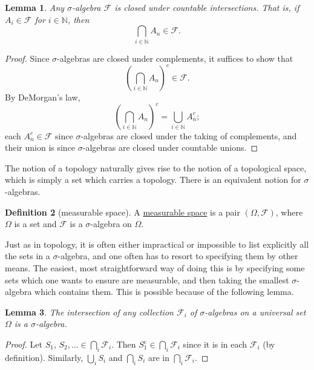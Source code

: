 \documentclass[a4paper,12pt]{scrreprt}
\newcommand{\N}{\mathbb{N}}
\newcommand{\defn}[1]{\ul{#1}}
\theoremstyle{definition}
\newtheorem{definition}{Definition}
\theoremstyle{plain}
\newtheorem{lemma}[definition]{Lemma}
\theoremstyle{remark}
\begin{document}
\begin{lemma}
  \label{lemma:sigmaalgebrasclosedundercountableintersections}
  Any $\sigma$-algebra $\mathcal{F}$ is closed under countable intersections. That is, if $A_{i} \in \mathcal{F}$ for $i \in \N$, then
  \begin{equation*}
    \bigcap_{i \in \N} A_{n} \in \mathcal{F}.
  \end{equation*}
\end{lemma}
\begin{proof}
  Since $\sigma$-algebras are closed under complements, it suffices to show that
  \begin{equation*}
    {\left( \bigcap_{i \in \N} A_{n} \right)}^{c} \in \mathcal{F}.
  \end{equation*}
  By DeMorgan's law,
  \begin{equation*}
    {\left( \bigcap_{i \in \N} A_{n} \right)}^{c} = \bigcup_{i \in \N} A^{c}_{n};
  \end{equation*}
  each $A^{c}_{n} \in \mathcal{F}$ since $\sigma$-algebras are closed under the taking of complements, and their union is since $\sigma$-algebras are closed under countable unions.
\end{proof}

The notion of a topology naturally gives rise to the notion of a topological space, which is simply a set which carries a topology. There is an equivalent notion for $\sigma$-algebras.

\begin{definition}[measurable space]
  \label{def:measurablespace}
  A \defn{measurable space} is a pair $(\Omega, \mathcal{F})$, where $\Omega$ is a set and $\mathcal{F}$ is a $\sigma$-algebra on $\Omega$.
\end{definition}

Just as in topology, it is often either impractical or impossible to list explicitly all the sets in a $\sigma$-algebra, and one often has to resort to specifying them by other means. The easiest, most straightforward way of doing this is by specifying some sets which one wants to ensure are measurable, and then taking the smallest $\sigma$-algebra which contains them. This is possible because of the following lemma.

\begin{lemma}
  The intersection of \emph{any} collection $\mathcal{F}_{i}$ of $\sigma$-algebras on a universal set $\Omega$ is a $\sigma$-algebra.
\end{lemma}

\begin{proof}
  Let $S_{1}$, $S_{2}, \ldots \in \bigcap_{i} \mathcal{F}_{i}$. Then $S_{1}^{\mathrm{c}} \in \bigcap_{i} \mathcal{F}_{i}$ since it is in each $\mathcal{F}_{i}$ (by definition). Similarly, $\bigcup_{i} S_{i}$ and $\bigcap_{i} S_{i}$ are in $\bigcap_{i} \mathcal{F}_{i}$.
\end{proof}
\end{document}
